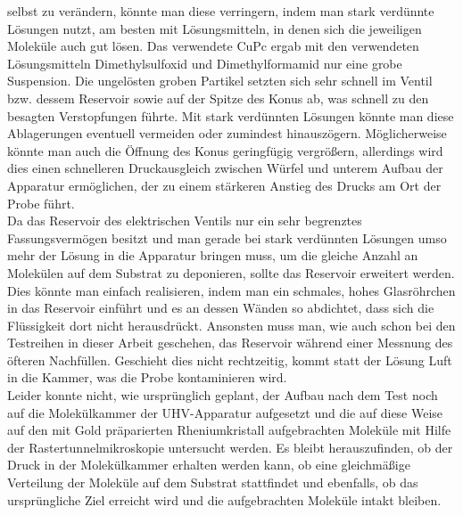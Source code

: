 selbst zu verändern, könnte man diese verringern, indem man stark verdünnte Lösungen nutzt, am
besten mit Lösungsmitteln, in denen sich die jeweiligen Moleküle auch gut lösen. Das verwendete CuPc
ergab mit den verwendeten Lösungsmitteln Dimethylsulfoxid und Dimethylformamid nur eine grobe
Suspension. Die ungelösten groben Partikel setzten sich sehr schnell im Ventil bzw. dessem Reservoir
sowie auf der Spitze des Konus ab, was schnell zu den besagten Verstopfungen führte. Mit stark
verdünnten Lösungen könnte man diese Ablagerungen eventuell vermeiden oder zumindest hinauszögern.
Möglicherweise könnte man auch die Öffnung des Konus geringfügig vergrößern, allerdings wird dies
einen schnelleren Druckausgleich zwischen Würfel und unterem Aufbau der Apparatur ermöglichen, der
zu einem stärkeren Anstieg des Drucks am Ort der Probe führt. 
\\
Da das Reservoir des elektrischen Ventils nur ein sehr begrenztes Fassungsvermögen besitzt und man
gerade bei stark verdünnten Lösungen umso mehr der Lösung in die Apparatur bringen muss, um die
gleiche Anzahl an Molekülen auf dem Substrat zu deponieren, sollte das Reservoir erweitert werden.
Dies könnte man einfach realisieren, indem man ein schmales, hohes Glasröhrchen in das Reservoir
einführt und es an dessen Wänden so abdichtet, dass sich die Flüssigkeit dort nicht herausdrückt.
Ansonsten muss man, wie auch schon bei den Testreihen in dieser Arbeit geschehen, das Reservoir
während einer Messnung des öfteren Nachfüllen. Geschieht dies nicht rechtzeitig, kommt statt
der Lösung Luft in die Kammer, was die Probe kontaminieren wird.
\\
Leider konnte nicht, wie ursprünglich geplant, der Aufbau nach dem Test noch auf die Molekülkammer
der UHV-Apparatur aufgesetzt und die auf diese Weise auf den mit Gold präparierten Rheniumkristall
aufgebrachten Moleküle mit Hilfe der Rastertunnelmikroskopie untersucht werden. Es bleibt
herauszufinden, ob der Druck in der Molekülkammer erhalten werden kann, ob eine gleichmäßige
Verteilung der Moleküle auf dem Substrat stattfindet und ebenfalls, ob das ursprüngliche Ziel
erreicht wird und die aufgebrachten Moleküle intakt bleiben.









